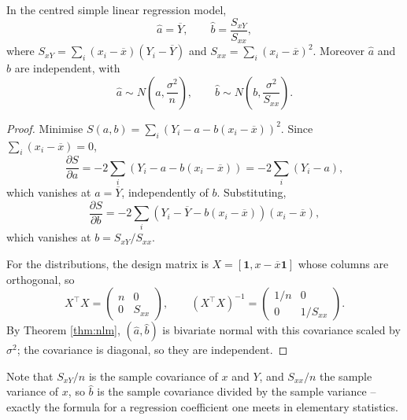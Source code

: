 \documentclass[a4paper]{scrartcl}
\begin{document}
\begin{proposition}
  In the centred simple linear regression model,
  $$
  \hat a = \overline{Y}, \qquad \hat b = \frac{S_{xY}}{S_{xx}},
  $$
  where $S_{xY} = \sum_i (x_i-\overline{x})(Y_i - \overline{Y})$ and $S_{xx} = \sum_i(x_i-\overline{x})^2$. Moreover $\hat a$ and $\hat b$ are independent, with
  $$
  \hat a \sim N\left(a, \frac{\sigma^2}{n}\right), \qquad \hat b \sim N\left(b, \frac{\sigma^2}{S_{xx}}\right).
  $$
\end{proposition}
\begin{proof}
  Minimise $S(a,b) = \sum_i\left(Y_i - a - b(x_i-\overline{x})\right)^2$. Since $\sum_i(x_i - \overline{x}) = 0$,
  $$
  \frac{\partial S}{\partial a} = -2\sum_i\left(Y_i - a - b(x_i-\overline{x})\right) = -2\sum_i(Y_i - a),
  $$
  which vanishes at $a = \overline{Y}$, independently of $b$. Substituting,
  $$
  \frac{\partial S}{\partial b} = -2\sum_i\left(Y_i - \overline{Y} - b(x_i-\overline{x})\right)(x_i-\overline{x}),
  $$
  which vanishes at $b = S_{xY}/S_{xx}$.

  For the distributions, the design matrix is $X = \left[\mathbf 1, x - \overline{x}\mathbf 1\right]$ whose columns are orthogonal, so
  $$
  X^\top X = \begin{pmatrix}n&0\\0&S_{xx}\end{pmatrix}, \qquad (X^\top X)^{-1} = \begin{pmatrix}1/n&0\\0&1/S_{xx}\end{pmatrix}.
  $$
  By Theorem \ref{thm:nlm}, $(\hat a,\hat b)$ is bivariate normal with this covariance scaled by $\sigma^2$; the covariance is diagonal, so they are independent.
\end{proof}

Note that $S_{xY}/n$ is the sample covariance of $x$ and $Y$, and $S_{xx}/n$ the sample variance of $x$, so $\hat b$ is the sample covariance divided by the sample variance -- exactly the formula for a regression coefficient one meets in elementary statistics.
\end{document}
